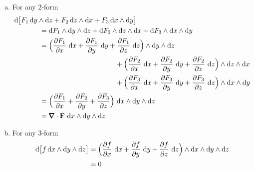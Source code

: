 \begin{eg}
\begin{enumerate}[(a)]
\item %
For any $2$-form
\begin{align*}
&\dee{}\big[F_1\,\dee{y}\wedge\dee{z}
 + F_2\,\dee{z}\wedge\dee{x}
 + F_3\,\dee{x}\wedge\dee{y}\big]
\\
&\hskip0.5in=\dee{F_1}\wedge\dee{y}\wedge\dee{z} 
+ \dee{F_2}\wedge\dee{z}\wedge\dee{x}  
+ \dee{F_3}\wedge\dee{x}\wedge\dee{y}
\\
&\hskip0.5in=\Big(\frac{\partial F_1}{\partial x}\ \dee{x}
      +\frac{\partial F_1}{\partial y}\ \dee{y}
      +\frac{\partial F_1}{\partial z}\ \dee{z}\Big)\wedge\dee{y}\wedge\dee{z}
   \\&\hskip2in
+\Big(\frac{\partial F_2}{\partial x}\ \dee{x}
      +\frac{\partial F_2}{\partial y}\ \dee{y}
      +\frac{\partial F_2}{\partial z}\ \dee{z}\Big)\wedge\dee{z}\wedge\dee{x}
   \\&\hskip2in
+\Big(\frac{\partial F_3}{\partial x}\ \dee{x}
      +\frac{\partial F_3}{\partial y}\ \dee{y}
      +\frac{\partial F_3}{\partial z}\ \dee{z}\Big)\wedge\dee{x}\wedge\dee{y}
\\
&\hskip0.5in=
  \Big(\frac{\partial F_1}{\partial x}
       +\frac{\partial F_2}{\partial y}
       +\frac{\partial F_3}{\partial z}\Big)
          \ \dee{x}\wedge\dee{y}\wedge\dee{z}
\\
&\hskip0.5in=
   \vnabla\cdot\vF\ \dee{x}\wedge\dee{y}\wedge\dee{z}
\end{align*}

\item %
For any $3$-form
\begin{align*}
\mathrm{d}\big[f\,\mathrm{d}x\wedge\mathrm{d}y\wedge\mathrm{d}z\big]
&=\Big(\frac{\partial f}{\partial x}\ \mathrm{d}x
      +\frac{\partial f}{\partial y}\ \mathrm{d}y
      +\frac{\partial f}{\partial z}\ \mathrm{d}z\Big)
    \wedge\mathrm{d}x\wedge\mathrm{d}y\wedge\mathrm{d}z\\
&=0
\end{align*}
\end{enumerate}
\end{eg}

